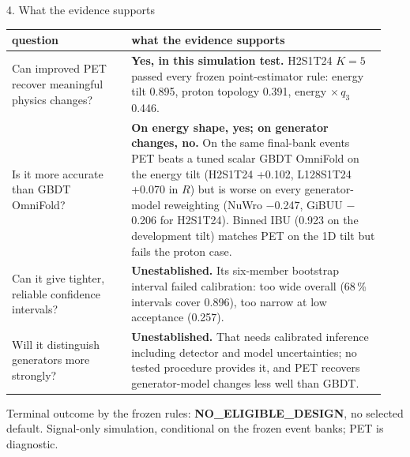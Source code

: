 \documentclass[aspectratio=169,10pt]{beamer}
\def\evidencetext{}
\begin{document}
\gdef\evidencetext{\texttt{results/final/decision\_look1.json}; \texttt{results/final/coverage\_dev/coverage\_H2S1T24K5.json}; \texttt{../gbdt\_comparison/results/comparison.json}; \texttt{scalar/results/SCALAR\_AUSSIE\_MATCHED-20260925.json}}
\begin{frame}{4. What the evidence supports}
{\footnotesize
\begin{tabular}{>{\raggedright\arraybackslash}p{0.30\linewidth}>{\raggedright\arraybackslash}p{0.64\linewidth}}
\toprule
question & what the evidence supports \\
\midrule
Can improved PET recover meaningful physics changes? & \textbf{Yes, in this simulation test.} H2S1T24 $K{=}5$ passed every frozen point-estimator rule: energy tilt 0.895, proton topology 0.391, energy $\times\,q_3$ 0.446. \\
Is it more accurate than GBDT OmniFold? & \textbf{On energy shape, yes; on generator changes, no.} On the same final-bank events PET beats a tuned scalar GBDT OmniFold on the energy tilt (H2S1T24 +0.102, L128S1T24 +0.070 in $R$) but is worse on every generator-model reweighting (NuWro \ensuremath{-}0.247, GiBUU \ensuremath{-}0.206 for H2S1T24). Binned IBU (0.923 on the development tilt) matches PET on the 1D tilt but fails the proton case. \\
Can it give tighter, reliable confidence intervals? & \textbf{Unestablished.} Its six-member bootstrap interval failed calibration: too wide overall (68\,\% intervals cover 0.896), too narrow at low acceptance (0.257). \\
Will it distinguish generators more strongly? & \textbf{Unestablished.} That needs calibrated inference including detector and model uncertainties; no tested procedure provides it, and PET recovers generator-model changes less well than GBDT. \\
\bottomrule
\end{tabular}}\par\vspace{0.15cm}\scriptsize Terminal outcome by the frozen rules: \textbf{NO\_ELIGIBLE\_DESIGN}, no selected default. Signal-only simulation, conditional on the frozen event banks; PET is diagnostic.
\end{frame}
\end{document}
